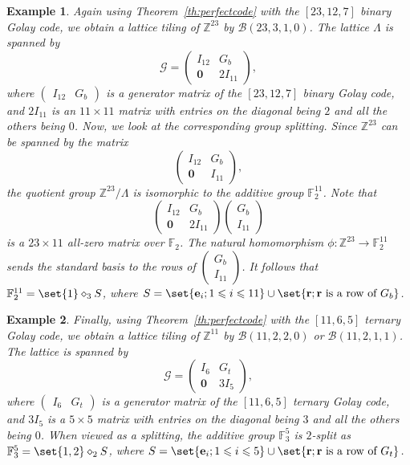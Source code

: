 \documentclass[sort&compress]{elsarticle}
\newcommand{\cB}{\mathcal{B}}
\newcommand{\cG}{\mathcal{G}}
\renewcommand{\leq}{\leqslant}
\newtheorem{example}{Example}
\newcommand{\F}{\mathbb{F}}
\newcommand{\Z}{\mathbb{Z}}
\newcommand{\ve}{\mathbf{e}}
\newcommand{\vr}{\mathbf{r}}
\newcommand{\Zero}{{\mathbf{0}}}
\newcommand{\splt}{\diamond}
\begin{document}
\begin{example}
  Again using Theorem~\ref{th:perfectcode} with the $[23,12,7]$ binary
  Golay code, we obtain a lattice tiling of $\Z^{23}$ by
  $\cB(23,3,1,0)$. The lattice $\Lambda$ is spanned by
  \[\cG=\begin{pmatrix}
  I_{12} & G_b \\
  \Zero & 2 I_{11}
  \end{pmatrix},\]
  where $\begin{pmatrix} I_{12} & G_b \end{pmatrix}$ is a generator
  matrix of the $[23,12,7]$ binary Golay code, and $2I_{11}$ is an
  $11\times 11$ matrix with entries on the diagonal being $2$ and all
  the others being $0$. Now, we look at the corresponding group
  splitting. Since $\Z^{23}$ can be spanned by the matrix
  \[\begin{pmatrix}
  I_{12} & G_b \\
  \Zero & I_{11}
  \end{pmatrix},\]
  the quotient group $\Z^{23} / \Lambda$ is isomorphic to the additive
  group $\F_2^{11}$. Note that
  \[ \begin{pmatrix}
    I_{12} & G_b \\
    \Zero & 2 I_{11}
  \end{pmatrix}
  \begin{pmatrix}
    G_b \\
    I_{11}
  \end{pmatrix}
  \]
  is a $23 \times 11$ all-zero matrix over $\F_2$.  The natural
  homomorphism $\phi: \Z^{23} \to \F_2^{11}$ sends the standard basis
  to the rows of $\begin{pmatrix} G_b \\ I_{11} \end{pmatrix}$. It
  follows that $\F_2^{11}=\set{1}\splt_3 S$, where $S=\set{\ve_i ;
    1\leq i\leq 11}\cup\set{\vr; \vr \text{ is a row of }G_b }$.
\end{example}

\begin{example}\label{ex:ex4}
  Finally, using Theorem~\ref{th:perfectcode} with the $[11,6,5]$
  ternary Golay code, we obtain a lattice tiling of $\Z^{11}$ by
  $\cB(11,2,2,0)$ or $\cB(11,2,1,1)$. The lattice is spanned by 
  \[\cG=\begin{pmatrix}
  I_6 & G_t \\
  \Zero & 3 I_5
  \end{pmatrix},\]
  where $\begin{pmatrix} I_6 & G_t \end{pmatrix}$ is a generator
  matrix of the $[11,6,5]$ ternary Golay code, and $3I_5$ is a
  $5\times 5$ matrix with entries on the diagonal being $3$ and all
  the others being $0$. When viewed as a splitting, the additive group
  $\F_3^{5}$ is $2$-split as $\F_3^{5}=\set{1,2}\splt_2 S$, where
  $S=\set{\ve_i ; 1\leq i\leq 5}\cup\set{\vr; \vr \textup{ is a row of
    }G_t }$.
\end{example}
\end{document}
